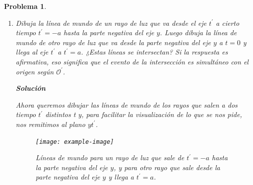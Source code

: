 \documentclass[12pt]{article}
\theoremstyle{break}
\newtheorem{exercise}{Problema}
\theoremstyle{nonumberbreak}
\newcommand*{\primeobserver}{\mathcal{O}^{\prime}}
\newcommand*{\inlinesol}{\vspace*{10pt}\textbf{Solución}\vspace*{10pt}}
\begin{document}
\begin{exercise}
\begin{enumerate}[label = \alph*)]
            \inlinesol

            Por hipótesis sabemos que los ejes espaciales de ambos sistemas están alineados, lo cual quiere decir que si los proyectamos en un plano adecuado, en particular el plano \(xy\), veremos lo siguiente

            \begin{figure}[htb]
                \centering
                \texttt{[image: example-image]}
                \caption{Eje \(x^{\prime}\) proyectado en el plano \(xy\).}
                \label{fig:Xprime-Planext}
            \end{figure}

            Si ahora dibujamos a \(x^{\prime}\) en el plano \(xt\), veríamos lo siguiente:

            \begin{figure}[htb]
                \centering
                \texttt{[image: example-image]}
                \caption{Eje \(x^{\prime}\) proyecto en el plano \(xt\).}
                \label{fig:Xprime-Planoxt}
            \end{figure}

            Además, notemos que \(\theta\) es igual al ángulo que hay entre \(t\) y \(t^{\prime}\), lo cual es análogo al caso que teníamos para el diagrama de espaciotiempo \(1+1\)-dimensional.

            \item Dibuja la línea de mundo de un rayo de luz que va desde el eje \(t^{\prime}\) a cierto tiempo \(t^{\prime} = -a\) hasta la parte negativa del eje \(y\). Luego dibuja la línea de mundo de otro rayo de luz que va desde la parte negativa del eje \(y\) a \(t = 0\) y llega al eje \(t^{\prime}\) a \(t^{\prime} = a\). ¿Estas líneas se intersectan? Si la respuesta es afirmativa, eso significa que el evento de la intersección es simultáneo con el origen según \(\primeobserver\).
            
            \inlinesol

            Ahora queremos dibujar las líneas de mundo de los rayos que salen a dos tiempo \(t^{\prime}\) distintos t y, para facilitar la visualización de lo que se nos pide, nos remitimos al plano \(yt^{\prime}\).

            \begin{figure}[htb]
                \centering
                \texttt{[image: example-image]}
                \caption{Líneas de mundo para un rayo de luz que sale de \(t^{\prime} = -a\) hasta la parte negativa del eje \(y\), y para otro rayo que sale desde la parte negativa del eje \(y\) y llega a \(t^{\prime} = a\).}
                \label{fig:Lineasmundo-Planoytprime}
            \end{figure}


\end{enumerate}
\end{exercise}
\end{document}
